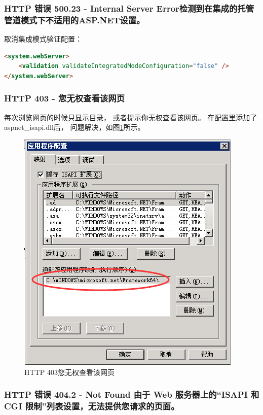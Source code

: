\documentclass{book}
\begin{document}
\subsubsection{HTTP 错误 500.23 - Internal Server Error检测到在集成的托管管道模式下不适用的ASP.NET设置。}
取消集成模式验证配置：
\begin{lstlisting}[language=HTML]
<system.webServer>  
    <validation validateIntegratedModeConfiguration="false" />
</system.webServer>
\end{lstlisting}

\subsubsection{HTTP 403 - 您无权查看该网页}

每次浏览网页的时候只显示目录，
或者提示你无权查看该网页。
在配置里添加了aspnet\_isapi.dll后，
问题解决，如图\ref{fig:HTTP403ErrorSolution}所示。

\begin{figure}[htbp]
	\centering
	\includegraphics[scale=0.8]{HTTP403ErrorSolution.jpg}
	\caption{HTTP 403您无权查看该网页}
	\label{fig:HTTP403ErrorSolution}
\end{figure}

\subsubsection{HTTP 错误 404.2 - Not Found 由于 Web 服务器上的“ISAPI 和 CGI 限制”列表设置，无法提供您请求的页面。}
\end{document}
